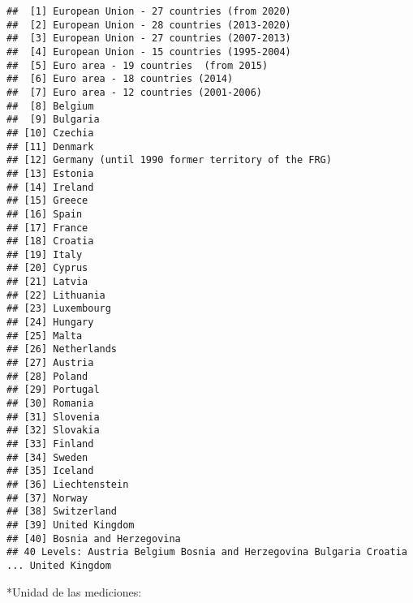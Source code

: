 \documentclass[]{article}
\newenvironment{Shaded}{\begin{snugshade}}{\end{snugshade}}
\newcommand{\KeywordTok}[1]{\textcolor[rgb]{0.13,0.29,0.53}{\textbf{#1}}}
\newcommand{\NormalTok}[1]{#1}
\newcommand{\OperatorTok}[1]{\textcolor[rgb]{0.81,0.36,0.00}{\textbf{#1}}}
\begin{document}
\begin{verbatim}
##  [1] European Union - 27 countries (from 2020)       
##  [2] European Union - 28 countries (2013-2020)       
##  [3] European Union - 27 countries (2007-2013)       
##  [4] European Union - 15 countries (1995-2004)       
##  [5] Euro area - 19 countries  (from 2015)           
##  [6] Euro area - 18 countries (2014)                 
##  [7] Euro area - 12 countries (2001-2006)            
##  [8] Belgium                                         
##  [9] Bulgaria                                        
## [10] Czechia                                         
## [11] Denmark                                         
## [12] Germany (until 1990 former territory of the FRG)
## [13] Estonia                                         
## [14] Ireland                                         
## [15] Greece                                          
## [16] Spain                                           
## [17] France                                          
## [18] Croatia                                         
## [19] Italy                                           
## [20] Cyprus                                          
## [21] Latvia                                          
## [22] Lithuania                                       
## [23] Luxembourg                                      
## [24] Hungary                                         
## [25] Malta                                           
## [26] Netherlands                                     
## [27] Austria                                         
## [28] Poland                                          
## [29] Portugal                                        
## [30] Romania                                         
## [31] Slovenia                                        
## [32] Slovakia                                        
## [33] Finland                                         
## [34] Sweden                                          
## [35] Iceland                                         
## [36] Liechtenstein                                   
## [37] Norway                                          
## [38] Switzerland                                     
## [39] United Kingdom                                  
## [40] Bosnia and Herzegovina                          
## 40 Levels: Austria Belgium Bosnia and Herzegovina Bulgaria Croatia ... United Kingdom
\end{verbatim}

*Unidad de las mediciones:

\begin{Shaded}
\end{Shaded}
\end{document}
